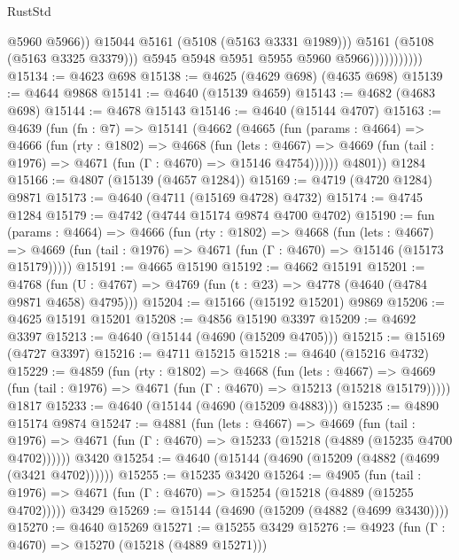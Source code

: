 \begin{lexlean}{RustStd}
\begin{coremodule}
                                  @5960
                                  @5966))
                              @15044
                              @5161
                              (@5108 (@5163 @3331 @1989)))
                            @5161
                            (@5108 (@5163 @3325 @3379)))
                          @5945
                          @5948
                          @5951
                          @5955
                          @5960
                          @5966)))))))))))
@15134 := @4623 @698
@15138 := @4625 (@4629 @698) (@4635 @698)
@15139 := @4644 @9868
@15141 := @4640 (@15139 @4659)
@15143 := @4682 (@4683 @698)
@15144 := @4678 @15143
@15146 := @4640 (@15144 @4707)
@15163 := @4639
    (fun (fn : @7) =>
    @15141
      (@4662
        (@4665
          (fun (params : @4664) =>
          @4666
            (fun (rty : @1802) =>
            @4668
              (fun (lets : @4667) =>
              @4669 (fun (tail : @1976) => @4671 (fun (Γ : @4670) => @15146 @4754))))))
        @4801))
    @1284
@15166 := @4807 (@15139 (@4657 @1284))
@15169 := @4719 (@4720 @1284) @9871
@15173 := @4640 (@4711 (@15169 @4728) @4732)
@15174 := @4745 @1284
@15179 := @4742 (@4744 @15174 @9874 @4700 @4702)
@15190 := fun (params : @4664) =>
  @4666
    (fun (rty : @1802) =>
    @4668
      (fun (lets : @4667) =>
      @4669 (fun (tail : @1976) => @4671 (fun (Γ : @4670) => @15146 (@15173 @15179)))))
@15191 := @4665 @15190
@15192 := @4662 @15191
@15201 := @4768
    (fun (U : @4767) => @4769 (fun (t : @23) => @4778 (@4640 (@4784 @9871 @4658) @4795)))
@15204 := @15166 (@15192 @15201) @9869
@15206 := @4625 @15191 @15201
@15208 := @4856 @15190 @3397
@15209 := @4692 @3397
@15213 := @4640 (@15144 (@4690 (@15209 @4705)))
@15215 := @15169 (@4727 @3397)
@15216 := @4711 @15215
@15218 := @4640 (@15216 @4732)
@15229 := @4859
    (fun (rty : @1802) =>
    @4668
      (fun (lets : @4667) =>
      @4669 (fun (tail : @1976) => @4671 (fun (Γ : @4670) => @15213 (@15218 @15179)))))
    @1817
@15233 := @4640 (@15144 (@4690 (@15209 @4883)))
@15235 := @4890 @15174 @9874
@15247 := @4881
    (fun (lets : @4667) =>
    @4669
      (fun (tail : @1976) =>
      @4671 (fun (Γ : @4670) => @15233 (@15218 (@4889 (@15235 @4700 @4702))))))
    @3420
@15254 := @4640 (@15144 (@4690 (@15209 (@4882 (@4699 (@3421 @4702))))))
@15255 := @15235 @3420
@15264 := @4905
    (fun (tail : @1976) => @4671 (fun (Γ : @4670) => @15254 (@15218 (@4889 (@15255 @4702)))))
    @3429
@15269 := @15144 (@4690 (@15209 (@4882 (@4699 @3430))))
@15270 := @4640 @15269
@15271 := @15255 @3429
@15276 := @4923 (fun (Γ : @4670) => @15270 (@15218 (@4889 @15271)))

\end{coremodule}
\end{lexlean}
